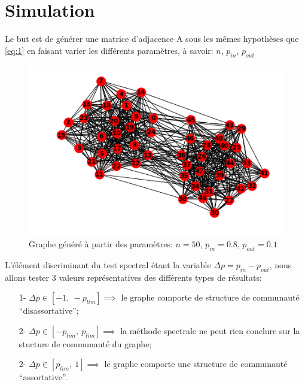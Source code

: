 \section{Simulation}
Le but est de générer une matrice d'adjacence A sous les mêmes hypothèses que \eqref{eq:1} en faisant varier les différents paramètres, à savoir: $n$, $p_{in}$, $p_{out}$ \\

\begin{figure}[H]
\centering
\includegraphics[scale=0.6]{static/graph_n50_pin08_pout01.png}
\caption{Graphe généré à partir des paramètres: $n=50$, $p_{in}=0.8$, $p_{out}=0.1$}
\end{figure}

L'élément discriminant du test spectral étant la variable $ \Delta p= p_{in} - p_{out}$, nous allons tester 3 valeurs représentatives des différents types de résultats:
\begin{itemize}
	\item[1-] $\Delta p \in [-1,\: -p_{lim}] \implies$ le graphe comporte de structure de communauté ``disassortative'';
	\item[2-] $\Delta p \in [-p_{lim},\: p_{lim}] \implies$ la méthode spectrale ne peut rien conclure sur la stucture de communauté du graphe;
	\item[2-] $\Delta p \in [p_{lim},\: 1] \implies$ le graphe comporte une structure de communauté ``assortative''.\\
\end{itemize}

